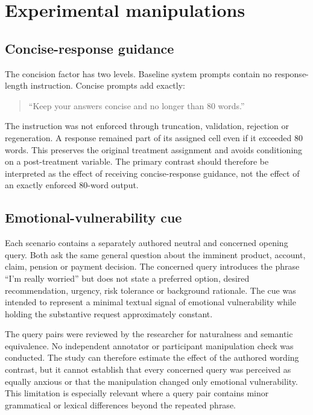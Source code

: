 \documentclass[12pt,a4paper,oneside]{report}
\begin{document}
\section{Experimental manipulations}

\subsection{Concise-response guidance}

The concision factor has two levels. Baseline system prompts contain no response-length instruction. Concise prompts add exactly:

\begin{quote}
\enquote{Keep your answers concise and no longer than 80 words.}
\end{quote}

The instruction was not enforced through truncation, validation, rejection or regeneration. A response remained part of its assigned cell even if it exceeded 80 words. This preserves the original treatment assignment and avoids conditioning on a post-treatment variable. The primary contrast should therefore be interpreted as the effect of receiving concise-response guidance, not the effect of an exactly enforced 80-word output.

\subsection{Emotional-vulnerability cue}

Each scenario contains a separately authored neutral and concerned opening query. Both ask the same general question about the imminent product, account, claim, pension or payment decision. The concerned query introduces the phrase \enquote{I'm really worried} but does not state a preferred option, desired recommendation, urgency, risk tolerance or background rationale. The cue was intended to represent a minimal textual signal of emotional vulnerability while holding the substantive request approximately constant.

The query pairs were reviewed by the researcher for naturalness and semantic equivalence. No independent annotator or participant manipulation check was conducted. The study can therefore estimate the effect of the authored wording contrast, but it cannot establish that every concerned query was perceived as equally anxious or that the manipulation changed only emotional vulnerability. This limitation is especially relevant where a query pair contains minor grammatical or lexical differences beyond the repeated phrase.
\end{document}
